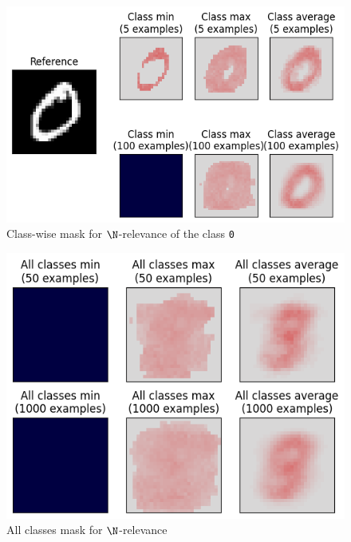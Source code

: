 \documentclass{../cs-classes/cs-classes}
\newcommand*{\1}{\digitsbb{1}}
\newcommand*{\0}{\digitsbb{0}}
\begin{document}
\begin{figure}[H]
    \centering
    \includegraphics[width=.5\textwidth]{counting-mask.png}
    \caption{Class-wise mask for $\N$-relevance of the class \texttt{0}}
\end{figure}

\begin{figure}[H]
    \centering
    \includegraphics[width=.5\textwidth]{counting-mask-all.png}
    \caption{All classes mask for $\N$-relevance}
\end{figure}
\end{document}
